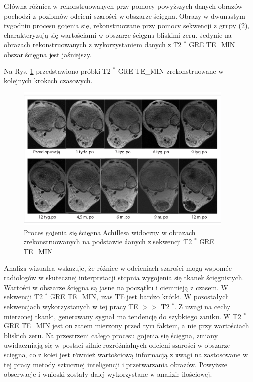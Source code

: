 Główna różnica w rekonstruowanych przy pomocy powyższych danych obrazów pochodzi z poziomów odcieni szarości w obszarze ścięgna. Obrazy w dwunastym tygodniu procesu gojenia się, rekonstruowane przy pomocy sekwencji z grupy (2), charakteryzują się wartościami w obszarze ścięgna bliskimi zeru. Jedynie na obrazach rekonstruowanych z wykorzystaniem danych z T2 $^\ast$ GRE TE\_MIN obszar ścięgna jest jaśniejszy. 

Na Rys. \ref{fig:T2comp} przedstawiono próbki T2 $^\ast$ GRE TE\_MIN zrekonstruowane w kolejnych krokach czasowych.

\begin{figure}[h]
	\centering
	\includegraphics[width=0.95\textwidth]{figures/T2gremin.jpg}
	\caption{Proces gojenia się ścięgna Achillesa widoczny w obrazach zrekonstruowanych na podstawie danych z sekwencji T2 $^\ast$ GRE TE\_MIN}\label{fig:T2comp}
\end{figure}

Analiza wizualna wskazuje, że różnice w odcieniach szarości mogą wspomóc radiologów w skutecznej interpretacji stopnia wygojenia się tkanek ścięgnistych. Wartości w obszarze ścięgna są jasne na początku i ciemnieją z czasem. 
W sekwencji T2 $^\ast$ GRE TE\_MIN, czas TE jest bardzo krótki. W pozostałych sekwencjach wykorzystanych w tej pracy TE $>>$ T2 $^\ast$. Z uwagi na cechy mierzonej tkanki, generowany sygnał ma tendencję do szybkiego zaniku. W T2 $^\ast$ GRE TE\_MIN jest on zatem mierzony przed tym faktem, a nie przy wartościach bliskich zeru. Na przestrzeni całego procesu gojenia się ścięgna, zmiany uwidaczniają się w postaci silnie rozróżnialnych odcieni szarości w obszarze ścięgna, co z kolei jest również wartościową informacją z uwagi na zastosowane w tej pracy metody sztucznej inteligencji i przetwarzania obrazów. Powyższe obserwacje i wnioski zostały dalej wykorzystane w analizie ilościowej.

